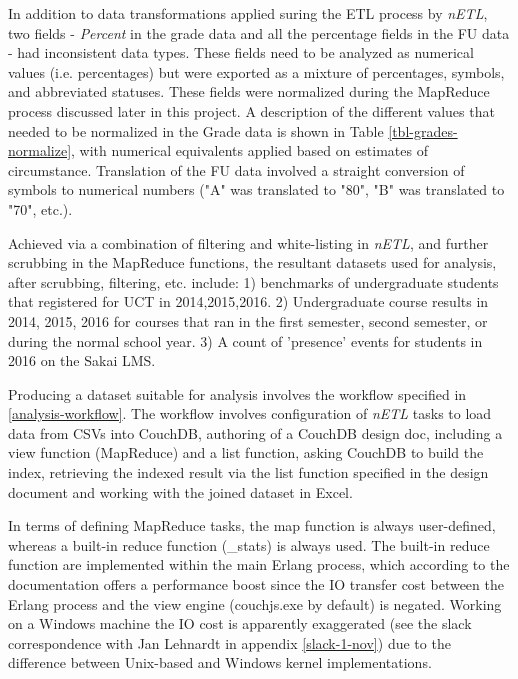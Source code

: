 In addition to data transformations applied suring the ETL process by \textit{nETL}, two fields - \textit{Percent} in the grade data and all the percentage fields in the FU data - had inconsistent data types. These fields need to be analyzed as numerical values (i.e. percentages) but were exported as a mixture of percentages, symbols, and abbreviated statuses. These fields were normalized during the MapReduce process discussed later in this project. A description of the different values that needed to be normalized in the Grade data is shown in Table \ref{tbl-grades-normalize}, with numerical equivalents applied based on estimates of circumstance. Translation of the FU data involved a straight conversion of symbols to numerical numbers ("A" was translated to "80", "B" was translated to "70", etc.).



Achieved via a combination of filtering and white-listing in \textit{nETL}, and further scrubbing in the MapReduce functions, the resultant datasets used for analysis, after scrubbing, filtering, etc. include: 1) benchmarks of undergraduate students that registered for UCT in 2014,2015,2016. 2) Undergraduate course results in 2014, 2015, 2016 for courses that ran in the first semester, second semester, or during the normal school year. 3) A count of 'presence' events for students in 2016 on the Sakai LMS.

Producing a dataset suitable for analysis involves the workflow specified in \ref{analysis-workflow}. The workflow involves configuration of \textit{nETL} tasks to load data from CSVs into CouchDB, authoring of a CouchDB design doc, including a view function (MapReduce) and a list function, asking CouchDB to build the index, retrieving the indexed result via the list function specified in the design document and working with the joined dataset in Excel.

In terms of defining MapReduce tasks, the map function is always user-defined, whereas a built-in reduce function (\_stats) is always used. The built-in reduce function are implemented within the main Erlang process, which according to the documentation offers a performance boost since the IO transfer cost between the Erlang process and the view engine (couchjs.exe by default) is negated. Working on a Windows machine the IO cost is apparently exaggerated (see the slack correspondence with Jan Lehnardt in appendix \ref{slack-1-nov}) due to the difference between Unix-based and Windows kernel implementations.

